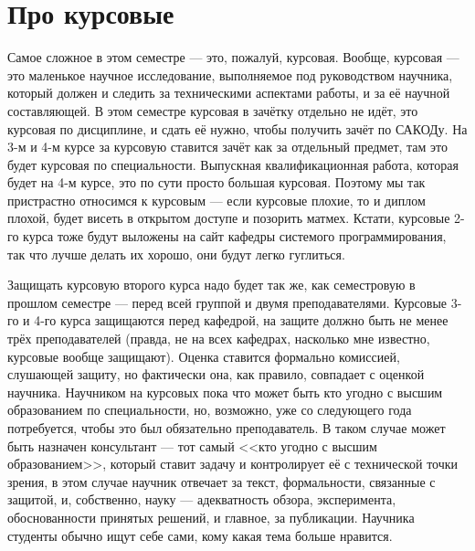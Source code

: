 \documentclass[a5paper]{article}
\begin{document}
\section{Про курсовые}

Самое сложное в этом семестре --- это, пожалуй, курсовая. Вообще, курсовая --- это маленькое научное исследование, выполняемое под руководством научника, который должен и следить за техническими аспектами работы, и за её научной составляющей. В этом семестре курсовая в зачётку отдельно не идёт, это курсовая по дисциплине, и сдать её нужно, чтобы получить зачёт по САКОДу. На 3-м и 4-м курсе за курсовую ставится зачёт как за отдельный предмет, там это будет курсовая по специальности. Выпускная квалификационная работа, которая будет на 4-м курсе, это по сути просто большая курсовая. Поэтому мы так пристрастно относимся к курсовым --- если курсовые плохие, то и диплом плохой, будет висеть в открытом доступе и позорить матмех. Кстати, курсовые 2-го курса тоже будут выложены на сайт кафедры системого программирования, так что лучше делать их хорошо, они будут легко гуглиться. 

Защищать курсовую второго курса надо будет так же, как семестровую в прошлом семестре --- перед всей группой и двумя преподавателями. Курсовые 3-го и 4-го курса защищаются перед кафедрой, на защите должно быть не менее трёх преподавателей (правда, не на всех кафедрах, насколько мне известно, курсовые вообще защищают). Оценка ставится формально комиссией, слушающей защиту, но фактически она, как правило, совпадает с оценкой научника. Научником на курсовых пока что может быть кто угодно с высшим образованием по специальности, но, возможно, уже со следующего года потребуется, чтобы это был обязательно преподаватель. В таком случае может быть назначен консультант --- тот самый <<кто угодно с высшим образованием>>, который ставит задачу и контролирует её с технической точки зрения, в этом случае научник отвечает за текст, формальности, связанные с защитой, и, собственно, науку --- адекватность обзора, эксперимента, обоснованности принятых решений, и главное, за публикации. Научника студенты обычно ищут себе сами, кому какая тема больше нравится.
\end{document}
